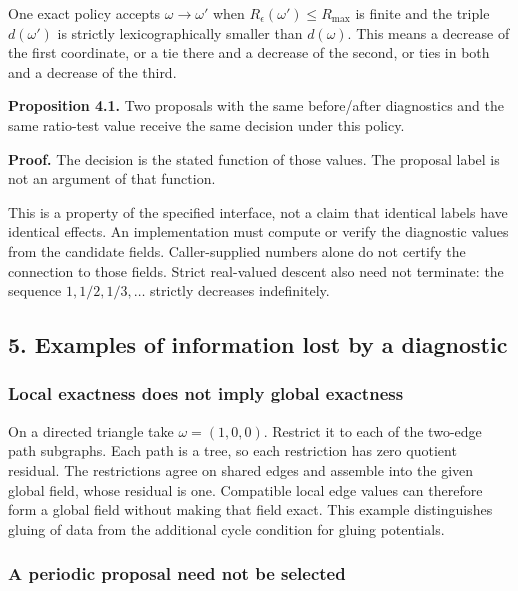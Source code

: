 \documentclass[
]{article}
\begin{document}
One exact policy accepts \(\omega\to\omega'\) when
\(R_\epsilon(\omega')\le R_{\max}\) is finite and the triple
\(d(\omega')\) is strictly lexicographically smaller than \(d(\omega)\).
This means a decrease of the first coordinate, or a tie there and a
decrease of the second, or ties in both and a decrease of the third.

\textbf{Proposition 4.1.} Two proposals with the same before/after
diagnostics and the same ratio-test value receive the same decision
under this policy.

\textbf{Proof.} The decision is the stated function of those values. The
proposal label is not an argument of that function.

This is a property of the specified interface, not a claim that
identical labels have identical effects. An implementation must compute
or verify the diagnostic values from the candidate fields.
Caller-supplied numbers alone do not certify the connection to those
fields. Strict real-valued descent also need not terminate: the sequence
\(1,1/2,1/3,\ldots\) strictly decreases indefinitely.

\subsection{5. Examples of information lost by a
diagnostic}\label{examples-of-information-lost-by-a-diagnostic}

\subsubsection{Local exactness does not imply global
exactness}\label{local-exactness-does-not-imply-global-exactness}

On a directed triangle take \(\omega=(1,0,0)\). Restrict it to each of
the two-edge path subgraphs. Each path is a tree, so each restriction
has zero quotient residual. The restrictions agree on shared edges and
assemble into the given global field, whose residual is one. Compatible
local edge values can therefore form a global field without making that
field exact. This example distinguishes gluing of data from the
additional cycle condition for gluing potentials.

\subsubsection{A periodic proposal need not be
selected}\label{a-periodic-proposal-need-not-be-selected}
\end{document}

